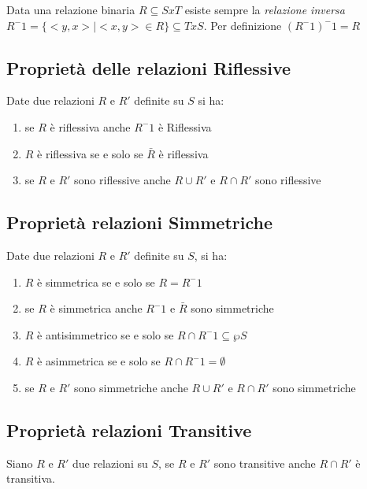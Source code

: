 Data una relazione binaria $R \subseteq S x T$ esiste sempre la \emph{relazione inversa}
$R^-1 = \{<y,x> | <x,y> \in R\} \subseteq T x S$.
Per definizione $(R ^ -1) ^ -1 = R$

\subsection{Proprietà delle relazioni Riflessive}
Date due relazioni $R$ e $R'$ definite su $S$ si ha:
\begin{enumerate}
    \item se $R$ è riflessiva anche $R^-1$ è Riflessiva
    \item $R$ è riflessiva se e solo se $\bar{R}$ è riflessiva
    \item se $R$ e $R'$ sono riflessive anche $R \cup R'$ e $R \cap R'$ sono riflessive
\end{enumerate}

\subsection{Proprietà relazioni Simmetriche}
Date due relazioni $R$ e $R'$ definite su $S$, si ha:
\begin{enumerate}
    \item $R$ è simmetrica se e solo se $R = R^-1$
    \item se $R$ è simmetrica anche $R^-1$ e $\bar{R}$ sono simmetriche
    \item $R$ è antisimmetrico se e solo se $R \cap R^-1 \subseteq \wp S$
    \item $R$ è asimmetrica se e solo se $R \cap R^-1 = \emptyset$
    \item se $R$ e $R'$ sono simmetriche anche $R \cup R'$ e $R \cap R'$ sono simmetriche
\end{enumerate}

\subsection{Proprietà relazioni Transitive}
Siano $R$ e $R'$ due relazioni su $S$, se $R$ e $R'$ sono transitive anche $R \cap R'$ è transitiva.

